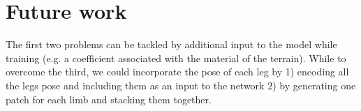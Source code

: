 \documentclass[../document.tex]{subfiles}
\begin{document}
\section{Future work}
The first two problems can be tackled by additional input to the model while training (e.g. a coefficient associated with the material of the terrain).  While to overcome the third, we could incorporate the pose of each leg by 1) encoding all the legs pose and including them as an input to the network  2) by  generating one patch for each limb and stacking them together.
\end{document}
